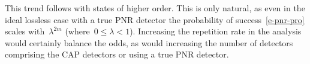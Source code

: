 \documentclass{article}
\begin{document}
This trend follows with states of higher order. This is only natural, as even in the ideal lossless case with a true PNR detector the probability of success~\eqref{e-pnr-pro} scales with~${\lambda^{2m}}$ (where~${0 \leq \lambda < 1}$). Increasing the repetition rate in the analysis would certainly balance the odds, as would increasing the number of detectors comprising the CAP detectors or using a true PNR detector.



\end{document}
